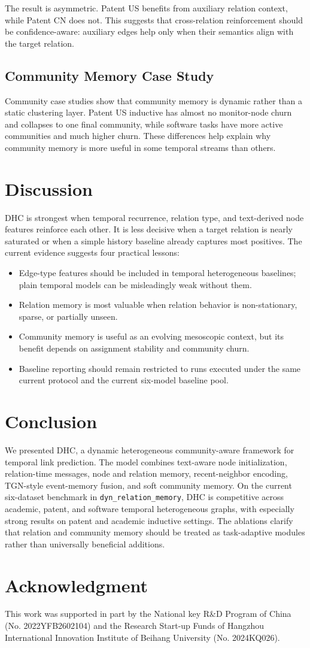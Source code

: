 \documentclass[runningheads]{llncs}
\begin{document}
The result is asymmetric. Patent US benefits from auxiliary relation context, while Patent CN does not. This suggests that cross-relation reinforcement should be confidence-aware: auxiliary edges help only when their semantics align with the target relation.

\subsection{Community Memory Case Study}


Community case studies show that community memory is dynamic rather than a static clustering layer. Patent US inductive has almost no monitor-node churn and collapses to one final community, while software tasks have more active communities and much higher churn. These differences help explain why community memory is more useful in some temporal streams than others.

\section{Discussion}
DHC is strongest when temporal recurrence, relation type, and text-derived node features reinforce each other. It is less decisive when a target relation is nearly saturated or when a simple history baseline already captures most positives. The current evidence suggests four practical lessons:
\begin{itemize}
\item Edge-type features should be included in temporal heterogeneous baselines; plain temporal models can be misleadingly weak without them.
\item Relation memory is most valuable when relation behavior is non-stationary, sparse, or partially unseen.
\item Community memory is useful as an evolving mesoscopic context, but its benefit depends on assignment stability and community churn.
\item Baseline reporting should remain restricted to runs executed under the same current protocol and the current six-model baseline pool.
\end{itemize}

\section{Conclusion}
We presented DHC, a dynamic heterogeneous community-aware framework for temporal link prediction. The model combines text-aware node initialization, relation-time messages, node and relation memory, recent-neighbor encoding, TGN-style event-memory fusion, and soft community memory. On the current six-dataset benchmark in \texttt{dyn\_relation\_memory}, DHC is competitive across academic, patent, and software temporal heterogeneous graphs, with especially strong results on patent and academic inductive settings. The ablations clarify that relation and community memory should be treated as task-adaptive modules rather than universally beneficial additions.

\section*{Acknowledgment}
This work was supported in part by the National key R\&D Program of China (No. 2022YFB2602104) and the Research Start-up Funds of Hangzhou International Innovation Institute of Beihang University (No. 2024KQ026).



\end{document}
